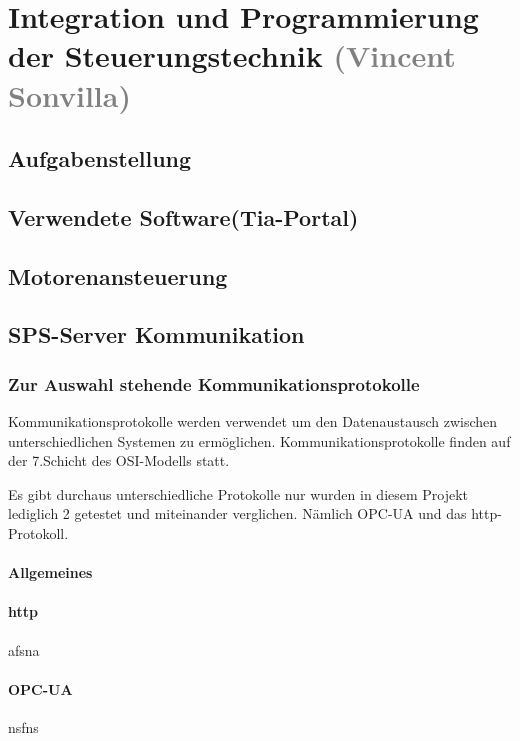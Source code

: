 \section{Integration und Programmierung der Steuerungstechnik \textcolor{gray}{ (Vincent Sonvilla)}}


\subsection{Aufgabenstellung}

\subsection{Verwendete Software(Tia-Portal)}

\subsection{Motorenansteuerung}

\subsection{SPS-Server Kommunikation}

    \subsubsection{Zur Auswahl stehende Kommunikationsprotokolle}

Kommunikationsprotokolle werden verwendet um den Datenaustausch zwischen unterschiedlichen Systemen zu ermöglichen.
Kommunikationsprotokolle finden auf der 7.Schicht des OSI-Modells statt.

Es gibt durchaus unterschiedliche Protokolle nur wurden in diesem Projekt lediglich 2 getestet und miteinander verglichen. Nämlich OPC-UA und das http-Protokoll.


        \paragraph{Allgemeines}

        
        \paragraph{http} 
        afsna

        \paragraph{OPC-UA}
        nsfns